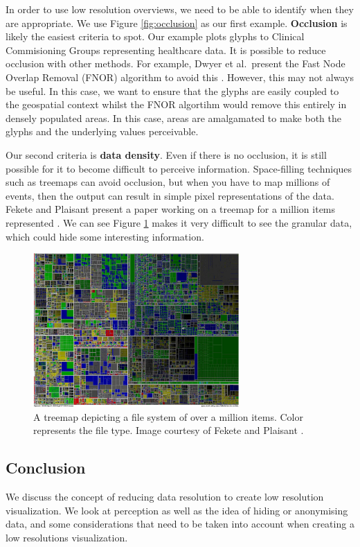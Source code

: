 In order to use low resolution overviews, we need to be able to identify when they are appropriate. We use Figure \ref{fig:occlusion} as our first example. \textbf{Occlusion} is likely the easiest criteria to spot. Our example plots glyphs to Clinical Commisioning Groups representing healthcare data. It is possible to reduce occlusion with other methods. For example, Dwyer et al.\ present the Fast Node Overlap Removal (FNOR) algorithm to avoid this \cite{dwyer2005fast}. However, this may not always be useful. In this case, we want to ensure that the glyphs are easily coupled to the geospatial context whilst the FNOR algortihm would remove this entirely in densely populated areas. In this case, areas are amalgamated to make both the glyphs and the underlying values perceivable.

Our second criteria is \textbf{data density}. Even if there is no occlusion, it is still possible for it to become difficult to perceive information. Space-filling techniques such as treemaps can avoid occlusion, but when you have to map millions of events, then the output can result in simple pixel representations of the data. Fekete and Plaisant present a paper working on a treemap for a million items represented \cite{fekete2002interactive}. We can see Figure \ref{fig:ch7treemap} makes it very difficult to see the granular data, which could hide some interesting information. 


\begin{figure}[t]
\includegraphics[width=0.7\textwidth]{images/ch7/treemap}
\caption{A treemap depicting a file system of over a million items. Color represents the file type. Image courtesy of Fekete and Plaisant \cite{dwyer2005fast}.} \label{fig:ch7treemap}
\end{figure}
\subsection{Conclusion}
We discuss the concept of reducing data resolution to create low resolution visualization. We look at perception as well as the idea of hiding or anonymising data, and some considerations that need to be taken into account when creating a low resolutions visualization.
